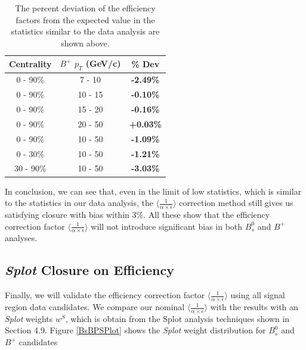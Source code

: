 \begin{table}[h]
\begin{center}
\caption{The  percent deviation of the efficiency factors from the expected value in the statistics similar to the data analysis are shown above.}
\vspace{1em}
\label{BPEffClosure}
  \begin{tabular}{| c | c |c |}
    \hline
     Centrality &   $B^+$  $p_T$ (GeV/c) &   \% Dev \\
    \hline
    \hline
0 - 90\% & 7 - 10 &  \textbf{-2.49\% }   \\ 
0 - 90\% & 10 - 15 &  \textbf{-0.10\% }   \\ 
0 - 90\% & 15 - 20 &   \textbf{-0.16\% }   \\ 
0 - 90\% & 20 - 50 &  \textbf{+0.03\% }   \\ 
0 - 90\% & 10 - 50 &  \textbf{-1.09\% }   \\ 
0 - 30\% & 10 - 50 &   \textbf{-1.21\% }   \\ 
30 - 90\% & 10 - 50 & \textbf{-3.03\% }   \\ 
    \hline
    \hline
\end{tabular}
\end{center}
\end{table}


In conclusion, we can see that, even in the limit of low statistics, which is similar to the statistics in our data analysis, the $\langle \frac{1}{\alpha \times \epsilon} \rangle$ correction method still gives us satisfying closure with bias within 3\%. All these show that the efficiency correction factor $\langle \frac{1}{\alpha \times \epsilon} \rangle$ will not introduce significant bias in both $B^0_s$ and $B^+$ analyses.


\subsection{\textit{Splot} Closure on Efficiency}

Finally, we will validate the efficiency correction factor $\langle \frac{1}{\alpha \times \epsilon} \rangle$ using all signal region data candidates. We compare our nominal $\langle \frac{1}{\alpha \times \epsilon} \rangle$ with the results with an \textit{Splot} weights $w^S$, which is obtain from the Splot analysis techniques shown in Section 4.9. Figure \ref{BsBPSPlot} shows the \textit{Splot} weight distribution for $B^0_s$ and $B^+$ candidates  

